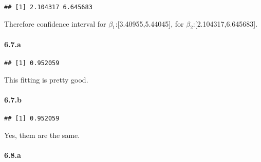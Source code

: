 \documentclass[]{article}
\newenvironment{Shaded}{\begin{snugshade}}{\end{snugshade}}
\newcommand{\DecValTok}[1]{\textcolor[rgb]{0.00,0.00,0.81}{#1}}
\newcommand{\KeywordTok}[1]{\textcolor[rgb]{0.13,0.29,0.53}{\textbf{#1}}}
\newcommand{\NormalTok}[1]{#1}
\newcommand{\OperatorTok}[1]{\textcolor[rgb]{0.81,0.36,0.00}{\textbf{#1}}}
\let\oldparagraph\paragraph
\renewcommand{\paragraph}[1]{\oldparagraph{#1}\mbox{}}
\begin{document}
\begin{verbatim}
## [1] 2.104317 6.645683
\end{verbatim}

Therefore confidence interval for \(\beta_1\):{[}3.40955,5.44045{]}, for
\(\beta_2\):{[}2.104317,6.645683{]}.

\hypertarget{a-2}{%
\paragraph{6.7.a}\label{a-2}}

\begin{Shaded}
\end{Shaded}

\begin{verbatim}
## [1] 0.952059
\end{verbatim}

This fitting is pretty good.

\hypertarget{b-2}{%
\paragraph{6.7.b}\label{b-2}}

\begin{Shaded}
\end{Shaded}

\begin{verbatim}
## [1] 0.952059
\end{verbatim}

Yes, them are the same.

\hypertarget{a-3}{%
\paragraph{6.8.a}\label{a-3}}
\end{document}
